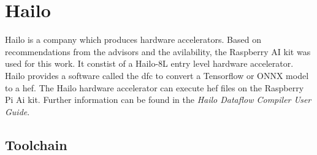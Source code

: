 \chapter{Hailo}

Hailo is a company which produces hardware accelerators.
Based on recommendations from the advisors and the avilability, the Raspberry AI kit was used for this work.
It constist of a Hailo-8L entry level hardware accelerator.
Hailo provides a software called the \Acrfull{dfc} to convert a Tensorflow or ONNX model to a \Acrfull{hef}.
The Hailo hardware accelerator can execute \acrshort{hef} files on the Raspberry Pi Ai kit.
Further information can be found in the \textit{Hailo Dataflow Compiler User Guide}.

\section{Toolchain}